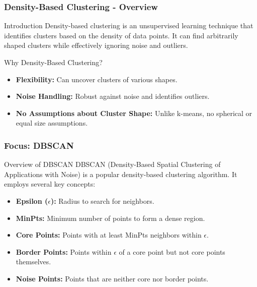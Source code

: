 \documentclass[aspectratio=169]{beamer}
\begin{document}
\begin{frame}[fragile]
    \frametitle{Density-Based Clustering - Overview}
    \begin{block}{Introduction}
        Density-based clustering is an unsupervised learning technique that identifies clusters based on the density of data points. 
        It can find arbitrarily shaped clusters while effectively ignoring noise and outliers.
    \end{block}
    
    \begin{block}{Why Density-Based Clustering?}
        \begin{itemize}
            \item \textbf{Flexibility:} Can uncover clusters of various shapes.
            \item \textbf{Noise Handling:} Robust against noise and identifies outliers.
            \item \textbf{No Assumptions about Cluster Shape:} Unlike k-means, no spherical or equal size assumptions.
        \end{itemize}
    \end{block}
\end{frame}

\begin{frame}[fragile]
    \frametitle{Focus: DBSCAN}
    \begin{block}{Overview of DBSCAN}
        DBSCAN (Density-Based Spatial Clustering of Applications with Noise) is a popular density-based clustering algorithm. It employs several key concepts:
    \end{block}
    
    \begin{itemize}
        \item \textbf{Epsilon ($\epsilon$):} Radius to search for neighbors.
        \item \textbf{MinPts:} Minimum number of points to form a dense region.
        \item \textbf{Core Points:} Points with at least MinPts neighbors within $\epsilon$.
        \item \textbf{Border Points:} Points within $\epsilon$ of a core point but not core points themselves.
        \item \textbf{Noise Points:} Points that are neither core nor border points.
    \end{itemize}
\end{frame}
\end{document}
